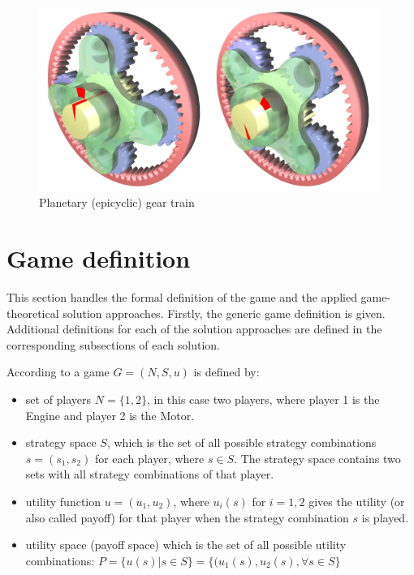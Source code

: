 \begin{figure}[h]
\centering
\includegraphics[scale=0.15]{figures/planetaryGear}
\caption{Planetary (epicyclic) gear train \citep{planetaryGear}}
\label{fig:planGear}
\end{figure}

\section{Game definition}
This section handles the formal definition of the game and the applied game-theoretical solution approaches. Firstly, the generic game definition is given. Additional definitions for each of the solution approaches are defined in the corresponding subsections of each solution.

According to \citet{holler2006einfuhrung} a game $G = (N,S,u)$ is defined by:
\begin{itemize}
\item
set of players $N = \{1,2\}$, in this case two players, where player 1 is the Engine and player 2 is the Motor.
\item
strategy space $S$, which is the set of all possible strategy combinations $s=(s_1,s_2)$ for each player, where $s \in S$. The strategy space contains two sets with all strategy combinations of that player.
\item
utility function $u = (u_1,u_2)$, where $u_i(s)$ for $i=1,2$ gives the utility (or also called payoff) for that player when the strategy combination $s$ is played.
\item
utility space (payoff space) which is the set of all possible utility combinations:
$P = \{u(s)|s \in S\} = \{(u_1(s),u_2(s),  \forall s \in S\}$
\end{itemize} 

